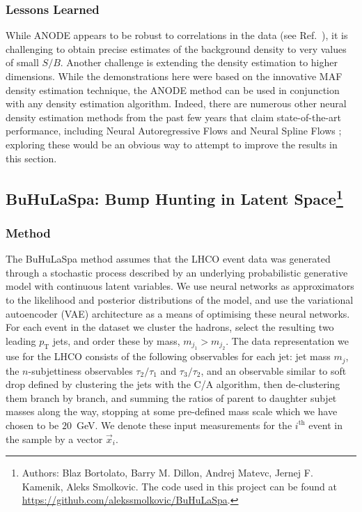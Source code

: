 \documentclass[a4paper,11pt]{article}
\begin{document}
\subsubsection{Lessons Learned}

While ANODE appears to be robust to correlations in the data (see Ref.~\cite{Nachman:2020lpy}), it is challenging to obtain precise estimates of the background density to very values of small $S/B$.  Another challenge is extending the density estimation to higher dimensions.  While the demonstrations here were based on the innovative MAF density estimation technique, the ANODE method can be used in conjunction with any density estimation algorithm.  Indeed, there are numerous other neural density estimation methods from the past few years that claim state-of-the-art performance, including Neural Autoregressive Flows \cite{DBLP:journals/corr/abs-1804-00779} and Neural Spline Flows \cite{durkan2019neural}; exploring these would be an obvious way to attempt to improve the results in this section. 

 \FloatBarrier
\subsection[BuHuLaSpa: Bump Hunting in Latent Space]{BuHuLaSpa: Bump Hunting in Latent Space\footnote{Authors: Blaz Bortolato, Barry M. Dillon, Andrej Matevc, Jernej F. Kamenik, Aleks Smolkovic.  The code used in this project can be found at \url{https://github.com/alekssmolkovic/BuHuLaSpa}.}}

\label{sec:buhula}

\subsubsection{Method}
\label{sec:method}

\noindent The BuHuLaSpa method assumes that the LHCO event data was generated through a stochastic process described by an underlying probabilistic generative model with continuous latent variables.
We use neural networks as approximators to the likelihood and posterior distributions of the model, and use the variational autoencoder (VAE) architecture as a means of optimising these neural networks.
For each event in the dataset we cluster the hadrons, select the resulting two leading $p_\text{T}$ jets, and order these by mass, $m_{j_1}>m_{j_2}$.
The data representation we use for the LHCO consists of the following observables for each jet: jet mass $m_{j}$, the $n$-subjettiness observables $\tau_2/\tau_1$ and $\tau_3/\tau_2$, and an observable similar to soft drop defined by clustering the jets with the C/A algorithm, then de-clustering them branch by branch, and summing the ratios of parent to daughter subjet masses along the way, stopping at some pre-defined mass scale which we have chosen to be $20$~GeV.
We denote these input measurements for the $i^{\text{th}}$ event in the sample by a vector $\vec{x}_i$.
\end{document}
